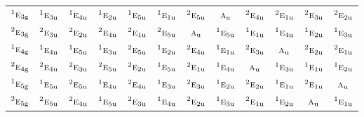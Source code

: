 \documentclass[10pt,a4paper]{article}
\numberwithin{equation}{section}
\newcommand{\irr}[1]{\text{\normalfont\scshape #1}}
\newcommand{\conjpair}[1]{{}^{#1}}
\newcommand{\ptag}[1]{\mathrm{#1}}
\begin{document}
{\begin{longtable}{@{}lccccccccccc@{}}
$\conjpair{1}\irr{e}_{3\ptag{g}}$ & $\conjpair{1}\irr{e}_{3\ptag{u}}$ & $\conjpair{1}\irr{e}_{4\ptag{u}}$ & $\conjpair{1}\irr{e}_{2\ptag{u}}$ & $\conjpair{1}\irr{e}_{5\ptag{u}}$ & $\conjpair{1}\irr{e}_{1\ptag{u}}$ & $\conjpair{2}\irr{e}_{5\ptag{u}}$ & $\irr{a}_{\ptag{u}}$ & $\conjpair{2}\irr{e}_{4\ptag{u}}$ & $\conjpair{2}\irr{e}_{1\ptag{u}}$ & $\conjpair{2}\irr{e}_{3\ptag{u}}$ & $\conjpair{2}\irr{e}_{2\ptag{u}}$\\
$\conjpair{2}\irr{e}_{3\ptag{g}}$ & $\conjpair{2}\irr{e}_{3\ptag{u}}$ & $\conjpair{2}\irr{e}_{2\ptag{u}}$ & $\conjpair{2}\irr{e}_{4\ptag{u}}$ & $\conjpair{2}\irr{e}_{1\ptag{u}}$ & $\conjpair{2}\irr{e}_{5\ptag{u}}$ & $\irr{a}_{\ptag{u}}$ & $\conjpair{1}\irr{e}_{5\ptag{u}}$ & $\conjpair{1}\irr{e}_{1\ptag{u}}$ & $\conjpair{1}\irr{e}_{4\ptag{u}}$ & $\conjpair{1}\irr{e}_{2\ptag{u}}$ & $\conjpair{1}\irr{e}_{3\ptag{u}}$\\
$\conjpair{1}\irr{e}_{4\ptag{g}}$ & $\conjpair{1}\irr{e}_{4\ptag{u}}$ & $\conjpair{1}\irr{e}_{5\ptag{u}}$ & $\conjpair{1}\irr{e}_{3\ptag{u}}$ & $\conjpair{2}\irr{e}_{5\ptag{u}}$ & $\conjpair{1}\irr{e}_{2\ptag{u}}$ & $\conjpair{2}\irr{e}_{4\ptag{u}}$ & $\conjpair{1}\irr{e}_{1\ptag{u}}$ & $\conjpair{2}\irr{e}_{3\ptag{u}}$ & $\irr{a}_{\ptag{u}}$ & $\conjpair{2}\irr{e}_{2\ptag{u}}$ & $\conjpair{2}\irr{e}_{1\ptag{u}}$\\
$\conjpair{2}\irr{e}_{4\ptag{g}}$ & $\conjpair{2}\irr{e}_{4\ptag{u}}$ & $\conjpair{2}\irr{e}_{3\ptag{u}}$ & $\conjpair{2}\irr{e}_{5\ptag{u}}$ & $\conjpair{2}\irr{e}_{2\ptag{u}}$ & $\conjpair{1}\irr{e}_{5\ptag{u}}$ & $\conjpair{2}\irr{e}_{1\ptag{u}}$ & $\conjpair{1}\irr{e}_{4\ptag{u}}$ & $\irr{a}_{\ptag{u}}$ & $\conjpair{1}\irr{e}_{3\ptag{u}}$ & $\conjpair{1}\irr{e}_{1\ptag{u}}$ & $\conjpair{1}\irr{e}_{2\ptag{u}}$\\
$\conjpair{1}\irr{e}_{5\ptag{g}}$ & $\conjpair{1}\irr{e}_{5\ptag{u}}$ & $\conjpair{2}\irr{e}_{5\ptag{u}}$ & $\conjpair{1}\irr{e}_{4\ptag{u}}$ & $\conjpair{2}\irr{e}_{4\ptag{u}}$ & $\conjpair{1}\irr{e}_{3\ptag{u}}$ & $\conjpair{2}\irr{e}_{3\ptag{u}}$ & $\conjpair{1}\irr{e}_{2\ptag{u}}$ & $\conjpair{2}\irr{e}_{2\ptag{u}}$ & $\conjpair{1}\irr{e}_{1\ptag{u}}$ & $\conjpair{2}\irr{e}_{1\ptag{u}}$ & $\irr{a}_{\ptag{u}}$\\
$\conjpair{2}\irr{e}_{5\ptag{g}}$ & $\conjpair{2}\irr{e}_{5\ptag{u}}$ & $\conjpair{2}\irr{e}_{4\ptag{u}}$ & $\conjpair{1}\irr{e}_{5\ptag{u}}$ & $\conjpair{2}\irr{e}_{3\ptag{u}}$ & $\conjpair{1}\irr{e}_{4\ptag{u}}$ & $\conjpair{2}\irr{e}_{2\ptag{u}}$ & $\conjpair{1}\irr{e}_{3\ptag{u}}$ & $\conjpair{2}\irr{e}_{1\ptag{u}}$ & $\conjpair{1}\irr{e}_{2\ptag{u}}$ & $\irr{a}_{\ptag{u}}$ & $\conjpair{1}\irr{e}_{1\ptag{u}}$\\

\end{longtable}}
\end{document}
